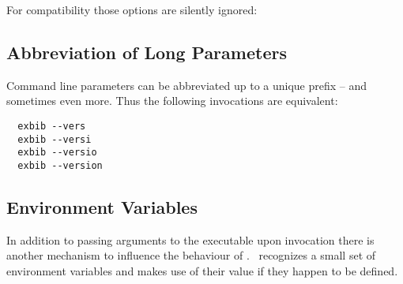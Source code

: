 For compatibility those options are silently ignored:
\begin{description}
\item[]
\item[]
\item[]
\item[]
\item[]
\item[]
\item[]
\item[]
\item[]
\item[]
\item[]
\item[]
\item[]
\item[]
\item[]
\end{description}


\subsection{Abbreviation of Long Parameters}

Command line parameters can be abbreviated up to a unique prefix --
and sometimes even more. Thus the following invocations are
equivalent:

\begin{verbatim}
  exbib --vers
  exbib --versi
  exbib --versio
  exbib --version  
\end{verbatim}


\subsection{Environment Variables}%

In addition to passing arguments to the executable upon invocation
there is another mechanism to influence the behaviour of \ExBib.
\ExBib\ recognizes a small set of environment variables and makes use
of their value if they happen to be defined.

